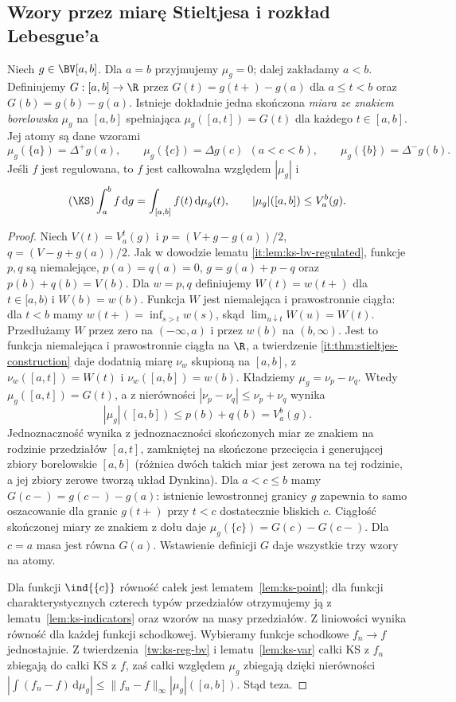 \subsection*{Wzory przez miarę Stieltjesa i rozkład Lebesgue'a}
\begin{twierdzenie}
\label{tw:ks-measure}
Niech $g\in\BV[a,b]$. Dla $a=b$ przyjmujemy $\mu_g=0$; dalej zakładamy $a<b$. Definiujemy $G:[a,b]\to\R$ przez $G(t)=g(t+)-g(a)$ dla $a\le t<b$ oraz $G(b)=g(b)-g(a)$. Istnieje dokładnie jedna skończona \emph{miara ze znakiem borelowska} $\mu_g$ na $[a,b]$ spełniająca $\mu_g([a,t])=G(t)$ dla każdego $t\in[a,b]$. Jej atomy są dane wzorami
\[
 \mu_g(\{a\})=\Delta^+g(a),\qquad
 \mu_g(\{c\})=\Delta g(c)\ \ (a<c<b),\qquad
 \mu_g(\{b\})=\Delta^-g(b).
\]
Jeśli $f$ jest regulowana, to $f$ jest całkowalna względem $|\mu_g|$ i
\[
 (\KS)\int_a^b f\,\mathrm dg=\int_{[a,b]}f(t)\,\mathrm d\mu_g(t),
 \qquad |\mu_g|([a,b])\le V_a^b(g).
\]
\end{twierdzenie}
\begin{proof}
Niech $V(t)=V_a^t(g)$ i $p=(V+g-g(a))/2$, $q=(V-g+g(a))/2$. Jak w dowodzie lematu \ref{it:lem:ks-bv-regulated}, funkcje $p,q$ są niemalejące, $p(a)=q(a)=0$, $g=g(a)+p-q$ oraz $p(b)+q(b)=V(b)$. Dla $w=p,q$ definiujemy $W(t)=w(t+)$ dla $t\in[a,b)$ i $W(b)=w(b)$. Funkcja $W$ jest niemalejąca i prawostronnie ciągła: dla $t<b$ mamy $w(t+)=\inf_{s>t}w(s)$, skąd $\lim_{u\downarrow t}W(u)=W(t)$. Przedłużamy $W$ przez zero na $(-\infty,a)$ i przez $w(b)$ na $(b,\infty)$. Jest to funkcja niemalejąca i prawostronnie ciągła na $\R$, a twierdzenie \ref{it:thm:stieltjes-construction} daje dodatnią miarę $\nu_w$ skupioną na $[a,b]$, z $\nu_w([a,t])=W(t)$ i $\nu_w([a,b])=w(b)$. Kładziemy $\mu_g=\nu_p-\nu_q$. Wtedy $\mu_g([a,t])=G(t)$, a z nierówności $|\nu_p-\nu_q|\le\nu_p+\nu_q$ wynika
\[
 |\mu_g|([a,b])\le p(b)+q(b)=V_a^b(g).
\]
Jednoznaczność wynika z jednoznaczności skończonych miar ze znakiem na rodzinie przedziałów $[a,t]$, zamkniętej na skończone przecięcia i generującej zbiory borelowskie $[a,b]$ (różnica dwóch takich miar jest zerowa na tej rodzinie, a jej zbiory zerowe tworzą układ Dynkina). Dla $a<c\le b$ mamy $G(c-)=g(c-)-g(a)$: istnienie lewostronnej granicy $g$ zapewnia to samo oszacowanie dla granic $g(t+)$ przy $t<c$ dostatecznie bliskich $c$. Ciągłość skończonej miary ze znakiem z dołu daje $\mu_g(\{c\})=G(c)-G(c-)$. Dla $c=a$ masa jest równa $G(a)$. Wstawienie definicji $G$ daje wszystkie trzy wzory na atomy.

Dla funkcji $\ind{\{c\}}$ równość całek jest lematem~\ref{lem:ks-point}; dla funkcji charakterystycznych czterech typów przedziałów otrzymujemy ją z lematu~\ref{lem:ks-indicators} oraz wzorów na masy przedziałów. Z liniowości wynika równość dla każdej funkcji schodkowej. Wybieramy funkcje schodkowe $f_n\to f$ jednostajnie. Z twierdzenia~\ref{tw:ks-reg-bv} i lematu~\ref{lem:ks-var} całki KS z $f_n$ zbiegają do całki KS z $f$, zaś całki względem $\mu_g$ zbiegają dzięki nierówności $|\int(f_n-f)\,\mathrm d\mu_g|\le\|f_n-f\|_\infty|\mu_g|([a,b])$. Stąd teza.
\end{proof}

